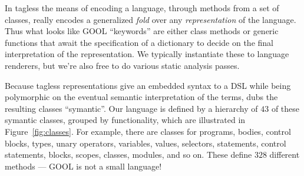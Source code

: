 \documentclass[sigplan,review,anonymous,prologue,dvipsnames]{acmart}
\begin{document}
In tagless the means of encoding a language,
through methods from a set of classes, really encodes a generalized
\emph{fold} over any \emph{representation} of the language.  Thus what
looks like GOOL ``keywords'' are either class methods or generic functions
that await the specification of a dictionary to decide on the final
interpretation of the representation.  We typically instantiate these to
language renderers, but we're also free to do various static analysis passes.

Because tagless representations give an embedded syntax to a DSL while
being polymorphic on the eventual semantic interpretation of the terms,
\cite{carette2009finally} dubs the resulting classes ``symantic''.
Our language is defined by a hierarchy of $43$ of these symantic classes,
grouped by functionality, which are illustrated in Figure~\ref{fig:classes}.  
For example, there are classes for programs,
bodies, control blocks, types, unary operators, variables, values, selectors,
statements, control statements, blocks, scopes, classes, modules, and so
on.  These define $328$ different methods --- GOOL is not a small language!
\end{document}

